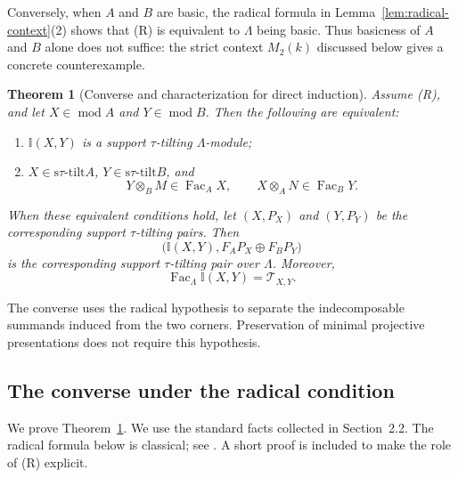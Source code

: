 \documentclass[11pt,reqno]{amsart}
\newtheorem{theorem}{Theorem}[section]
\theoremstyle{definition}
\theoremstyle{remark}
\newcommand{\modu}{\operatorname{mod}}
\newcommand{\Fac}{\operatorname{Fac}}
\newcommand{\stau}{\mathrm{s}\tau\text{-}\mathrm{tilt}}
\numberwithin{equation}{section}
\begin{document}
Conversely, when $A$ and $B$ are basic, the radical formula in
Lemma~\ref{lem:radical-context}\textup{(2)} shows that \textup{(R)} is
equivalent to $\Lambda$ being basic.  Thus basicness of $A$ and $B$ alone
does not suffice: the strict context $M_2(k)$ discussed below gives a concrete
counterexample.

\begin{theorem}[Converse and characterization for direct induction]
\label{thm:direct-characterization}
Assume \textup{(R)}, and let $X\in\modu A$ and $Y\in\modu B$.
Then the following are equivalent:
\begin{enumerate}[label=\textup{(\arabic*)},leftmargin=2.2em]
 \item $\mathbb I(X,Y)$ is a support $\tau$-tilting $\Lambda$-module;
 \item $X\in\stau A$, $Y\in\stau B$, and
 \[
  Y\otimes_BM\in\Fac_AX,
  \qquad
  X\otimes_AN\in\Fac_BY.
 \]
\end{enumerate}
When these equivalent conditions hold, let $(X,P_X)$ and $(Y,P_Y)$ be the
corresponding support $\tau$-tilting pairs.  Then
\[
 \bigl(\mathbb I(X,Y),F_AP_X\oplus F_BP_Y\bigr)
\]
is the corresponding support $\tau$-tilting pair over $\Lambda$.
Moreover,
\[
 \Fac_\Lambda\mathbb I(X,Y)=\mathcal T_{X,Y}.
\]
\end{theorem}

The converse uses the radical hypothesis to separate the indecomposable
summands induced from the two corners.  Preservation of minimal
projective presentations does not require this hypothesis.

\subsection{The converse under the radical condition}

We prove Theorem~\ref{thm:direct-characterization}.  We use the standard
facts collected in Section~2.2.  The radical formula below is classical;
see \cite{Sands}.  A short proof is included to make the role of
\textup{(R)} explicit.
\end{document}
